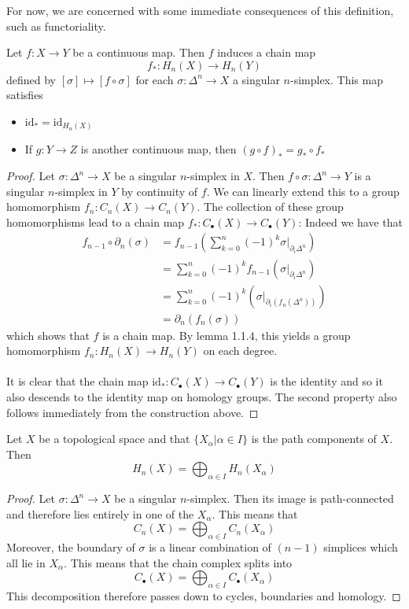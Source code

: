 \documentclass[a4paper]{article}
\begin{document}
For now, we are concerned with some immediate consequences of this definition, such as functoriality. 

\begin{prp}{}{} Let $f:X\to Y$ be a continuous map. Then $f$ induces a chain map $$f_\ast:H_n(X)\to H_n(Y)$$ defined by $[\sigma]\mapsto[f\circ\sigma]$ for each $\sigma:\Delta^n\to X$ a singular $n$-simplex. This map satisfies 
\begin{itemize}
\item $\text{id}_\ast=\text{id}_{H_n(X)}$
\item If $g:Y\to Z$ is another continuous map, then $(g\circ f)_\ast=g_\ast\circ f_\ast$
\end{itemize} \tcbline
\begin{proof}
Let $\sigma:\Delta^n\to X$ be a singular $n$-simplex in $X$. Then $f\circ\sigma:\Delta^n\to Y$ is a singular $n$-simplex in $Y$ by continuity of $f$. We can linearly extend this to a group homomorphism $f_n:C_n(X)\to C_n(Y)$. The collection of these group homomorphisms lead to a chain map $f_\ast:C_\bullet(X)\to C_\bullet(Y)$: Indeed we have that 
\begin{align*}
f_{n-1}\circ\partial_n(\sigma)&=f_{n-1}\left(\sum_{k=0}^n(-1)^k\sigma|_{\partial_i\Delta^n}\right)\\
&=\sum_{k=0}^n(-1)^kf_{n-1}\left(\sigma|_{\partial_i\Delta^n}\right)\\
&=\sum_{k=0}^n(-1)^k\left(\sigma|_{\partial_i(f_n(\Delta^n))}\right)\\
&=\partial_n(f_n(\sigma))
\end{align*}
which shows that $f$ is a chain map. By lemma 1.1.4, this yields a group homomorphism $f_n:H_n(X)\to H_n(Y)$ on each degree. \\~\\

It is clear that the chain map $\text{id}_\ast:C_\bullet(X)\to C_\bullet(Y)$ is the identity and so it also descends to the identity map on homology groups. The second property also follows immediately from the construction above. 
\end{proof}
\end{prp}

\begin{prp}{}{} Let $X$ be a topological space and that $\{X_\alpha|\alpha\in I\}$ is the path components of $X$. Then $$H_n(X)=\bigoplus_{\alpha\in I} H_n(X_\alpha)$$ \tcbline
\begin{proof}
Let $\sigma:\Delta^n\to X$ be a singular $n$-simplex. Then its image is path-connected and therefore lies entirely in one of the $X_\alpha$. This means that $$C_n(X)=\bigoplus_{\alpha\in I}C_n(X_\alpha)$$ Moreover, the boundary of $\sigma$ is a linear combination of $(n-1)$ simplices which all lie in $X_\alpha$. This means that the chain complex splits into $$C_\bullet(X)=\bigoplus_{\alpha\in I}C_\bullet(X_\alpha)$$ This decomposition therefore passes down to cycles, boundaries and homology. 
\end{proof}
\end{prp}
\end{document}
